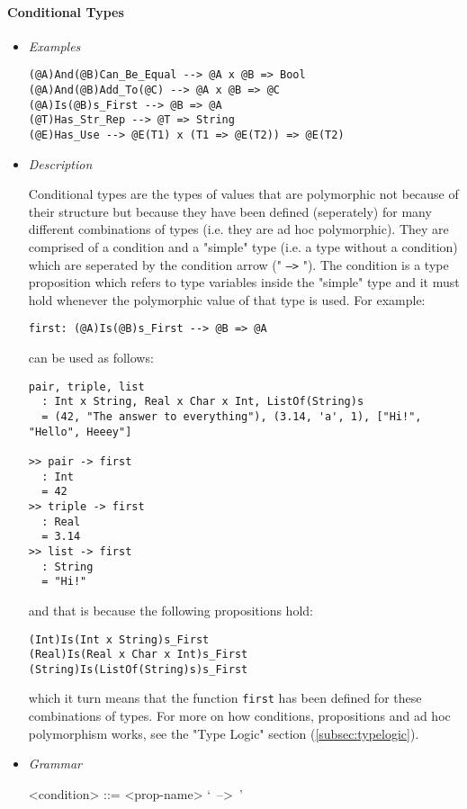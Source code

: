 \documentclass{article}
\begin{document}
\newpage

\paragraph{Conditional Types}

\begin{itemize}
\item \textit{Examples}
\begin{verbatim}
(@A)And(@B)Can_Be_Equal --> @A x @B => Bool
(@A)And(@B)Add_To(@C) --> @A x @B => @C
(@A)Is(@B)s_First --> @B => @A
(@T)Has_Str_Rep --> @T => String
(@E)Has_Use --> @E(T1) x (T1 => @E(T2)) => @E(T2)
\end{verbatim}

\item \textit{Description}

Conditional types are the types of values that are polymorphic not because of
their structure but because they have been defined (seperately) for many
different combinations of types (i.e. they are ad hoc polymorphic). They are
comprised of a condition and a "simple" type (i.e. a type without a condition)
which are seperated by the condition arrow (" \texttt{-->} "). The condition is
a type proposition which refers to type variables inside the "simple" type and
it must hold whenever the polymorphic value of that type is used. For example:
\begin{verbatim}
first: (@A)Is(@B)s_First --> @B => @A
\end{verbatim}
can be used as follows:
\begin{verbatim}
pair, triple, list
  : Int x String, Real x Char x Int, ListOf(String)s
  = (42, "The answer to everything"), (3.14, 'a', 1), ["Hi!", "Hello", Heeey"]

>> pair -> first
  : Int
  = 42
>> triple -> first
  : Real
  = 3.14
>> list -> first
  : String
  = "Hi!"
\end{verbatim}
and that is because the following propositions hold:
\begin{verbatim}
(Int)Is(Int x String)s_First
(Real)Is(Real x Char x Int)s_First
(String)Is(ListOf(String)s)s_First
\end{verbatim}
which it turn means that the function \texttt{first} has been defined for these
combinations of types. For more on how conditions, propositions and ad hoc
polymorphism works, see the "Type Logic" section (\ref{subsec:typelogic}).

\item \textit{Grammar}
\begin{grammar}
<condition> ::= <prop-name> `\ -->\ ' 
\end{grammar}

\end{itemize}
\end{document}
